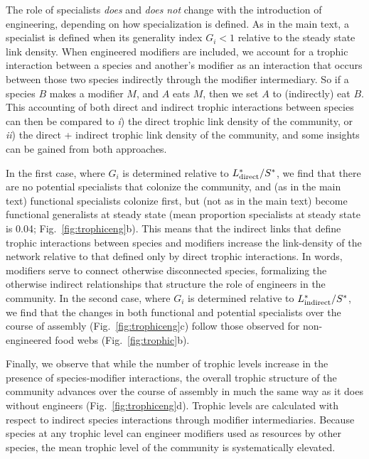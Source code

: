 \documentclass[twocolumn,preprintnumbers,amsmath,amssymb,superscriptaddress,linenumbers]{revtex4-1}
\begin{document}
\begin{bibunit}
The role of specialists \emph{does} and \emph{does not} change with the introduction of engineering, depending on how specialization is defined.
As in the main text, a specialist is defined when its generality index $G_i < 1$ relative to the steady state link density.
When engineered modifiers are included, we account for a trophic interaction between a species and another's modifier as an interaction that occurs between those two species indirectly through the modifier intermediary.
So if a species $B$ makes a modifier $M$, and $A$ eats $M$, then we set $A$ to (indirectly) eat $B$.
This accounting of both direct and indirect trophic interactions between species can then be compared to \emph{i}) the direct trophic link density of the community, or \emph{ii}) the direct + indirect trophic link density of the community, and some insights can be gained from both approaches.

In the first case, where $G_i$ is determined relative to $L^*_{\rm direct}/S^*$, we find that there are no potential specialists that colonize the community, and (as in the main text) functional specialists colonize first, but (not as in the main text) become functional generalists at steady state (mean proportion specialists at steady state is 0.04; Fig.\ \ref{fig:trophiceng}b).
This means that the indirect links that define trophic interactions between species and modifiers increase the link-density of the network relative to that defined only by direct trophic interactions.
In words, modifiers serve to connect otherwise disconnected species, formalizing the otherwise indirect relationships that structure the role of engineers in the community.
In the second case, where $G_i$ is determined relative to $L^*_{\rm indirect}/S^*$, we find that the changes in both functional and potential specialists over the course of assembly (Fig.\ \ref{fig:trophiceng}c) follow those observed for non-engineered food webs (Fig.\ \ref{fig:trophic}b).

Finally, we observe that while the number of trophic levels increase in the presence of species-modifier interactions, the overall trophic structure of the community advances over the course of assembly in much the same way as it does without engineers (Fig.\ \ref{fig:trophiceng}d).
Trophic levels are calculated with respect to indirect species interactions through modifier intermediaries.
Because species at any trophic level can engineer modifiers used as resources by other species, the mean trophic level of the community is systematically elevated.


\end{bibunit}
\end{document}

